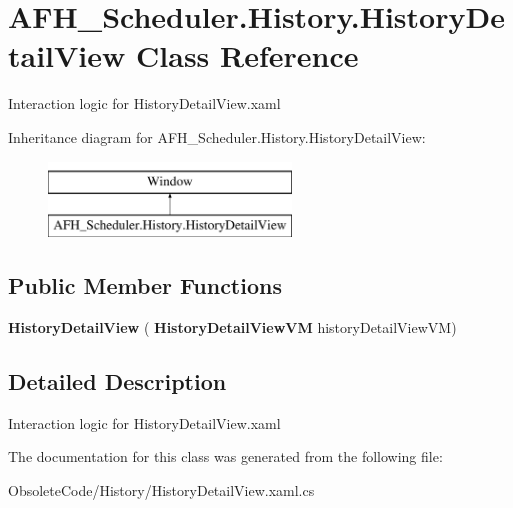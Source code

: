 \section{A\+F\+H\+\_\+\+Scheduler.\+History.\+History\+Detail\+View Class Reference}
\label{class_a_f_h___scheduler_1_1_history_1_1_history_detail_view}


Interaction logic for History\+Detail\+View.\+xaml  


Inheritance diagram for A\+F\+H\+\_\+\+Scheduler.\+History.\+History\+Detail\+View\+:\begin{figure}[H]
\begin{center}
\leavevmode
\includegraphics[height=2.000000cm]{class_a_f_h___scheduler_1_1_history_1_1_history_detail_view}
\end{center}
\end{figure}
\subsection*{Public Member Functions}
\begin{DoxyCompactItemize}
\item 
\mbox{\label{class_a_f_h___scheduler_1_1_history_1_1_history_detail_view_a8ab00cd39ef75fc9fee3f427c28aa453}} 
{\bfseries History\+Detail\+View} (\textbf{ History\+Detail\+View\+VM} history\+Detail\+View\+VM)
\end{DoxyCompactItemize}


\subsection{Detailed Description}
Interaction logic for History\+Detail\+View.\+xaml 



The documentation for this class was generated from the following file\+:\begin{DoxyCompactItemize}
\item 
Obsolete\+Code/\+History/History\+Detail\+View.\+xaml.\+cs\end{DoxyCompactItemize}
